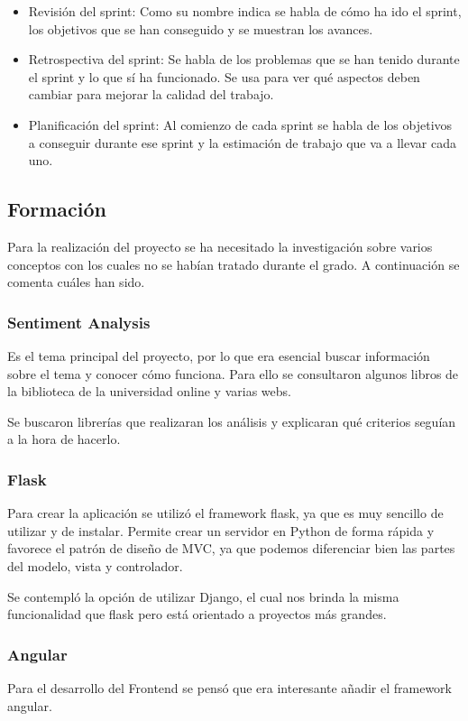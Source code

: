 \begin{itemize}\tightlist
    \item Revisión del sprint: Como su nombre indica se habla de cómo ha ido el sprint, los objetivos que se han conseguido y se muestran los avances.
    \item Retrospectiva del sprint: Se habla de los problemas que se han tenido durante el sprint y lo que sí ha funcionado. Se usa para ver qué aspectos deben cambiar para mejorar la calidad del trabajo.
    \item Planificación del sprint: Al comienzo de cada sprint se habla de los objetivos a conseguir durante ese sprint y la estimación de trabajo que va a llevar cada uno.
    
\end{itemize}

\subsection{Formación}
Para la realización del proyecto se ha necesitado la investigación sobre varios conceptos con los cuales no se habían tratado durante el grado. A continuación se comenta cuáles han sido.

\subsubsection{Sentiment Analysis}
Es el tema principal del proyecto, por lo que era esencial buscar información sobre el tema y conocer cómo funciona.
Para ello se consultaron algunos libros de la biblioteca de la universidad online y varias webs. 

Se buscaron librerías que realizaran los análisis y explicaran qué criterios seguían a la hora de hacerlo.

\subsubsection{Flask}
Para crear la aplicación se utilizó el framework flask, ya que es muy sencillo de utilizar y de instalar. 
Permite crear un servidor en Python de forma rápida y favorece el patrón de diseño de MVC, ya que podemos diferenciar bien las partes del modelo, vista y controlador.

Se contempló la opción de utilizar Django, el cual nos brinda la misma funcionalidad que flask pero está orientado a proyectos más grandes.

\subsubsection{Angular}
Para el desarrollo del Frontend se pensó que era interesante añadir el framework angular.

